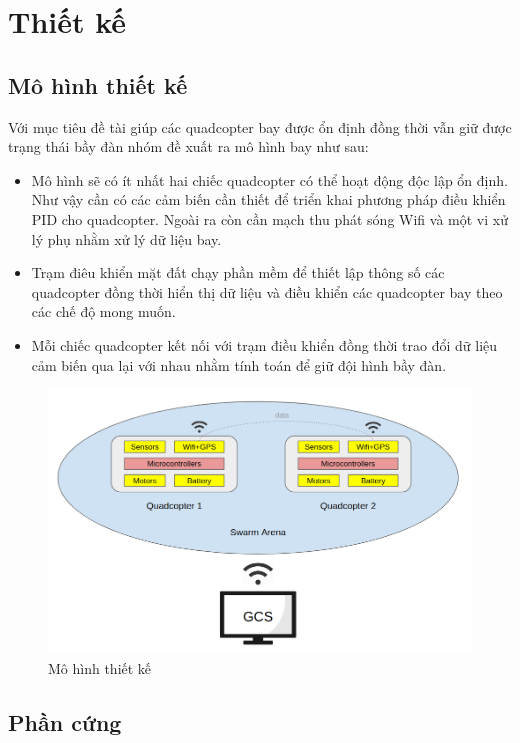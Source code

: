 \chapter{Thiết kế}

\section{Mô hình thiết kế}
    Với mục tiêu đề tài giúp các quadcopter bay được ổn định đồng thời vẫn giữ được trạng thái bầy đàn nhóm đề xuất ra mô hình bay như sau:
    \begin{itemize}
    	\item Mô hình sẽ có ít nhất hai chiếc quadcopter có thể hoạt động độc lập ổn định. Như vậy cần có các cảm biến cần thiết để triển khai phương pháp điều khiển PID cho quadcopter. Ngoài ra còn cần mạch thu phát sóng Wifi và một vi xử lý phụ nhằm xử lý dữ liệu bay.
    	\item Trạm điêu khiển mặt đất chạy phần mềm để thiết lập thông số các quadcopter đồng thời hiển thị dữ liệu và điều khiển các quadcopter bay theo các chế độ mong muốn.
    	\item Mỗi chiếc quadcopter kết nối với trạm điều khiển đồng thời trao đổi dữ liệu cảm biến qua lại với nhau nhằm tính toán để giữ đội hình bầy đàn.
    \end{itemize}
    
    \begin{figure}[h!]
    	\begin{center}
    		\includegraphics[scale=0.5]{images/design_model.png}
    		\caption{Mô hình thiết kế}
    	\end{center}
    \end{figure}
    
\section{Phần cứng} 
